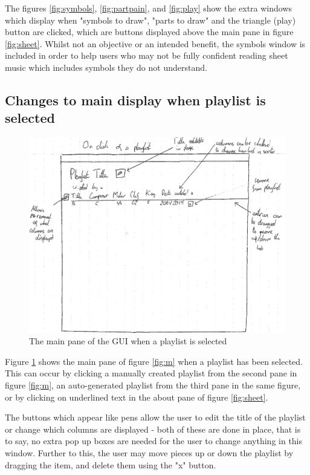 \begin{appendices}
\begin{figure}[H]
\begin{minipage}{160pt}
\end{minipage}
\end{figure}
The figures \ref{fig:symbols}, \ref{fig:partpain}, and \ref{fig:play} show the extra windows which display when "symbols to draw", "parts to draw" and the triangle (play) button are clicked, which are buttons displayed above the main pane in figure \ref{fig:sheet}. Whilst not an objective or an intended benefit, the symbols window is included in order to help users who may not be fully confident reading sheet music which includes symbols they do not understand.

\subsection{Changes to main display when playlist is selected}
\begin{figure}[H]
	\includegraphics[width=500pt]{designs/playlist}
	\caption{The main pane of the GUI when a playlist is selected}
	\label{fig:playlist}
\end{figure}
Figure \ref{fig:playlist} shows the main pane of figure \ref{fig:m} when a playlist has been selected. This can occur by clicking a manually created playlist from the second pane in figure \ref{fig:m}, an auto-generated playlist from the third pane in the same figure, or by clicking on underlined text in the about pane of figure \ref{fig:sheet}.

The buttons which appear like pens allow the user to edit the title of the playlist or change which columns are displayed - both of these are done in place, that is to say, no extra pop up boxes are needed for the user to change anything in this window. Further to this, the user may move pieces up or down the playlist by dragging the item, and delete them using the "x" button.


\end{appendices}
